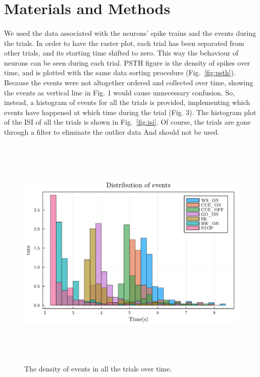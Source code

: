 \documentclass[9pt,twocolumn]{paper-template}
\begin{document}
\section*{Materials and Methods}
\paragraph*{}
We used the data associated with the neurons' spike trains and the events during the trials. In order to have the raster plot, each trial has been separated from other trials, and its starting time shifted to zero. This way the behaviour of neurons can be seen during each trial. PSTH figure is the density of spikes over time, and is plotted with the same data sorting procedure (Fig.~\ref{fig:psth}). Because the events were not altogether ordered and collected over time, showing the events as vertical line in Fig. 1 would cause unnecessary confusion. So, instead, a histogram of events for all the trials is provided, implementing which events have happened at which time during the trial (Fig. 3). The histogram plot of the ISI of all the trials is shown in Fig.~\ref{fig:isi}. Of course, the trials are gone through a filter to eliminate the outlier data And should not be used.

\begin{figure}
\centering
\includegraphics[width=12cm,height=11.4cm]{EvDist.pdf}
\caption{The density of events in all the trials over time.}\label{fig:events}
\end{figure}
\end{document}
